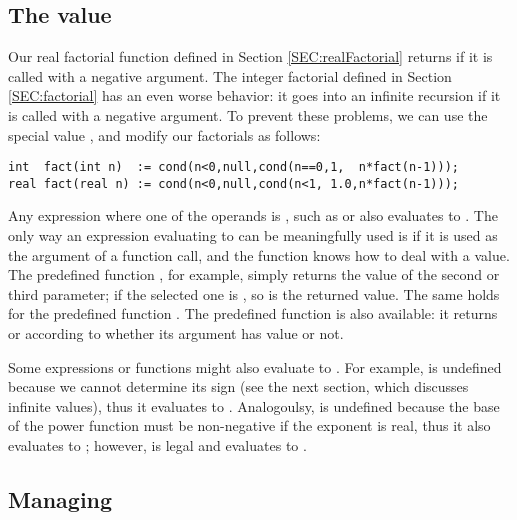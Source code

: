 \subsection{The  value}

Our real factorial function defined in Section \ref{SEC:realFactorial} 
returns  if it is called with a negative argument.
The integer factorial defined in Section
\ref{SEC:factorial} has an even worse behavior: it goes into an
infinite recursion if it is called with a negative argument.  
To prevent these problems, we can use the special value , and
modify our factorials as follows:
\begin{lstlisting}
int  fact(int n)  := cond(n<0,null,cond(n==0,1,  n*fact(n-1)));
real fact(real n) := cond(n<0,null,cond(n<1, 1.0,n*fact(n-1))); 
\end{lstlisting}

Any expression where one of the operands is ,
such as  or  also evaluates
to .
The only way an expression evaluating to  can be meaningfully
used is if it is used as the argument of a function call, and the function
knows how to deal with a  value.
The predefined function , for example,
simply returns the value of the second or third parameter; if the
selected one is , so is the returned value.  The same holds
for the predefined function .
The predefined function  is also available:
it returns  or 
according to whether its argument has value  or not.

Some expressions or functions might also evaluate to .
For example,  is undefined because we cannot determine its
sign (see the next section, which discusses infinite values), thus
it evaluates to .
Analogoulsy,  is undefined because the base of the power
function must be non-negative if the exponent is real, thus it also
evaluates to ;
however,  is legal and evaluates to .

\subsection{Managing }

